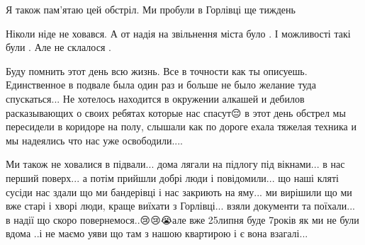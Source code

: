 \begin{itemize}
\begin{itemize}
Я також пам'ятаю цей обстріл. Ми пробули в Горлівці ще тиждень
\end{itemize}

 
Ніколи ніде не ховався. А от надія на звільнення міста було . І можливості такі
були . Але не склалося .


 

Буду помнить этот день всю жизнь. Все в точности как ты описуешь. Единственное
в подвале была один раз и больше не было желание туда спускаться... Не хотелось
находится в окружении алкашей и дебилов расказывающих о своих ребятах которые
нас спасут😔 в этот день обстрел мы пересидели в коридоре на полу, слышали как
по дороге ехала тяжелая техника и мы надеялись что нас уже освободили....


 

Ми також не ховалися в підвали... дома лягали на підлогу під вікнами... в нас
перший поверх... а потім прийшли добрі люди і повідомили... що наші кляті сусіди
нас здали що ми бандерівці і нас закриють на яму... ми вирішили що ми вже старі
і хворі люди, краще виїхати з Горлівці... взяли документи та поїхали... в надії
що скоро повернемося..😢😢😭але вже 25липня буде 7років як ми не були вдома ..і
не маємо уяви що там з нашою квартирою і є вона взагалі...

\end{itemize}

